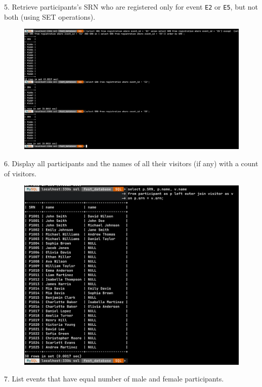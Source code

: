 \documentclass[12pt,a4paper]{article}
\begin{document}
\pagebreak

5. Retrieve participants's SRN who are registered only for event \texttt{E2} or \texttt{E5}, but not both (using SET operations).

\begin{figure}[H]
    \centering 
    \includegraphics[width=0.9\linewidth]{./images/task2/5.png}
\end{figure}

6. Display all participants and the names of all their visitors (if any) with a count of visitors.

\begin{figure}[H]
    \centering 
    \includegraphics[width=0.9\linewidth]{./images/task2/6.png}
\end{figure}

7. List events that have equal number of male and female participants.
\end{document}
